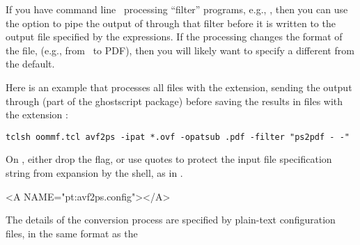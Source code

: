 If you have command line \postscript\ processing ``filter'' programs,
e.g., , then you can
use the  option to pipe the output of  through
that filter before it is written to the output file specified by the
 expressions.  If the processing changes the format of the
file, (e.g., from \postscript\ to PDF), then you will
likely want to specify a  different from the default.

Here is an example that processes all files with the 
extension, sending the output through  (part of the
ghostscript package) before saving the results in files with the
extension :
\begin{verbatim}
tclsh oommf.tcl avf2ps -ipat *.ovf -opatsub .pdf -filter "ps2pdf - -"
\end{verbatim}
On \Unix, either drop the  flag, or use quotes to protect
the input file specification string from expansion by the shell, as in
.

\begin{rawhtml}
<A NAME="pt:avf2ps.config"></A>
\end{rawhtml}
The details of the conversion process are specified by plain-text
configuration files, in the same format as the

